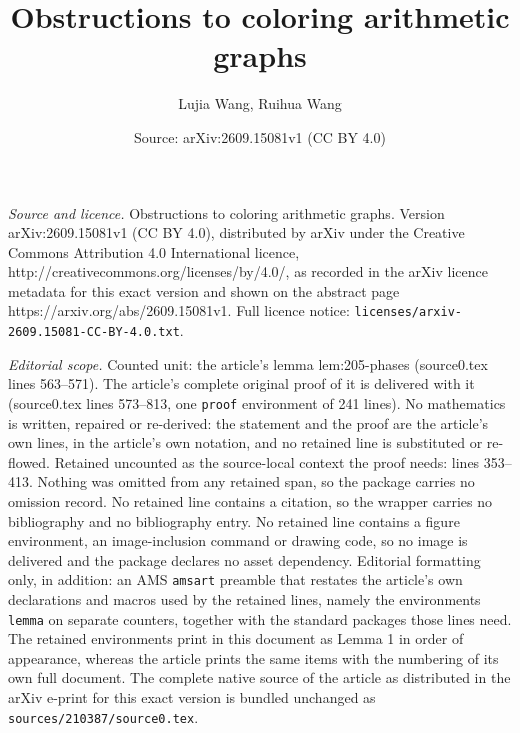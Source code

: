 \documentclass[10pt,a4paper]{amsart}
\title{Obstructions to coloring arithmetic graphs}
\author{Lujia Wang, Ruihua Wang}
\date{Source: arXiv:2609.15081v1 (CC BY 4.0)}
\begin{document}
\maketitle

\noindent\emph{Source and licence.} Obstructions to coloring arithmetic graphs. Version arXiv:2609.15081v1 (CC BY 4.0), distributed by arXiv under the Creative Commons Attribution 4.0 International licence, http://creativecommons.org/licenses/by/4.0/, as recorded in the arXiv licence metadata for this exact version and shown on the abstract page https://arxiv.org/abs/2609.15081v1. Full licence notice: \texttt{licenses/arxiv-2609.15081-CC-BY-4.0.txt}.\par\smallskip

\noindent\textit{Editorial scope.} Counted unit: the article's lemma lem:205-phases (source0.tex lines 563--571). The article's complete original proof of it is delivered with it (source0.tex lines 573--813, one \texttt{proof} environment of 241 lines). No mathematics is written, repaired or re-derived: the statement and the proof are the article's own lines, in the article's own notation, and no retained line is substituted or re-flowed.  Retained uncounted as the source-local context the proof needs: lines 353--413.  Nothing was omitted from any retained span, so the package carries no omission record.  No retained line contains a citation, so the wrapper carries no bibliography and no bibliography entry.  No retained line contains a figure environment, an image-inclusion command or drawing code, so no image is delivered and the package declares no asset dependency.  Editorial formatting only, in addition: an AMS \texttt{amsart} preamble that restates the article's own declarations and macros used by the retained lines, namely the environments \texttt{lemma} on separate counters, together with the standard packages those lines need.  The retained environments print in this document as Lemma 1 in order of appearance, whereas the article prints the same items with the numbering of its own full document.  The complete native source of the article as distributed in the arXiv e-print for this exact version is bundled unchanged as \texttt{sources/210387/source0.tex}.
\end{document}
